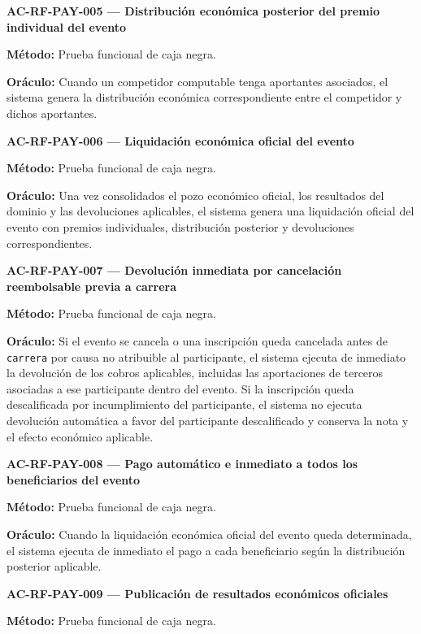 \documentclass[10pt,letterpaper]{article}
\begin{document}
\noindent\textbf{AC-RF-PAY-005 --- Distribución económica posterior del premio individual del evento}\par
\textbf{Método:} Prueba funcional de caja negra.\par
\textbf{Oráculo:} Cuando un competidor computable tenga aportantes asociados, el sistema genera la distribución económica correspondiente entre el competidor y dichos aportantes.\par\vspace{0.45em}
\noindent\textbf{AC-RF-PAY-006 --- Liquidación económica oficial del evento}\par
\textbf{Método:} Prueba funcional de caja negra.\par
\textbf{Oráculo:} Una vez consolidados el pozo económico oficial, los resultados del dominio y las devoluciones aplicables, el sistema genera una liquidación oficial del evento con premios individuales, distribución posterior y devoluciones correspondientes.\par\vspace{0.45em}
\noindent\textbf{AC-RF-PAY-007 --- Devolución inmediata por cancelación reembolsable previa a carrera}\par
\textbf{Método:} Prueba funcional de caja negra.\par
\textbf{Oráculo:} Si el evento se cancela o una inscripción queda cancelada antes de \texttt{carrera} por causa no atribuible al participante, el sistema ejecuta de inmediato la devolución de los cobros aplicables, incluidas las aportaciones de terceros asociadas a ese participante dentro del evento. Si la inscripción queda descalificada por incumplimiento del participante, el sistema no ejecuta devolución automática a favor del participante descalificado y conserva la nota y el efecto económico aplicable.\par\vspace{0.45em}
\noindent\textbf{AC-RF-PAY-008 --- Pago automático e inmediato a todos los beneficiarios del evento}\par
\textbf{Método:} Prueba funcional de caja negra.\par
\textbf{Oráculo:} Cuando la liquidación económica oficial del evento queda determinada, el sistema ejecuta de inmediato el pago a cada beneficiario según la distribución posterior aplicable.\par\vspace{0.45em}
\noindent\textbf{AC-RF-PAY-009 --- Publicación de resultados económicos oficiales}\par
\textbf{Método:} Prueba funcional de caja negra.\par
\end{document}
